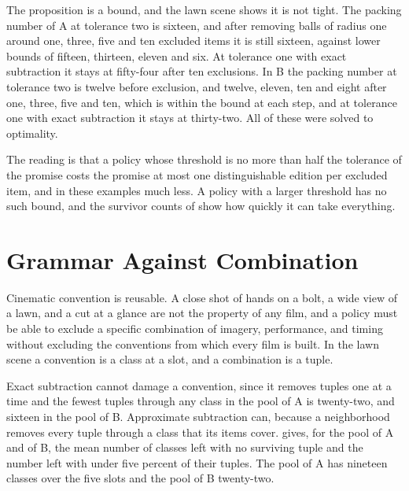 \documentclass[11pt,twoside,openright]{book}
\theoremstyle{plain}
\theoremstyle{definition}
\theoremstyle{remark}
\begin{document}
The proposition is a bound, and the lawn scene shows it is not tight. The packing number of A at tolerance two is sixteen, and after removing balls of radius one around one, three, five and ten excluded items it is still sixteen, against lower bounds of fifteen, thirteen, eleven and six. At tolerance one with exact subtraction it stays at fifty-four after ten exclusions. In B the packing number at tolerance two is twelve before exclusion, and twelve, eleven, ten and eight after one, three, five and ten, which is within the bound at each step, and at tolerance one with exact subtraction it stays at thirty-two. All of these were solved to optimality.

The reading is that a policy whose threshold is no more than half the tolerance of the promise costs the promise at most one distinguishable edition per excluded item, and in these examples much less. A policy with a larger threshold has no such bound, and the survivor counts of  show how quickly it can take everything.

\section{Grammar Against Combination}\label{sec:grammar15}

Cinematic convention is reusable. A close shot of hands on a bolt, a wide view of a lawn, and a cut at a glance are not the property of any film, and a policy must be able to exclude a specific combination of imagery, performance, and timing without excluding the conventions from which every film is built. In the lawn scene a convention is a class at a slot, and a combination is a tuple.

Exact subtraction cannot damage a convention, since it removes tuples one at a time and the fewest tuples through any class in the pool of A is twenty-two, and sixteen in the pool of B. Approximate subtraction can, because a neighborhood removes every tuple through a class that its items cover.  gives, for the pool of A and of B, the mean number of classes left with no surviving tuple and the number left with under five percent of their tuples. The pool of A has nineteen classes over the five slots and the pool of B twenty-two.
\end{document}
